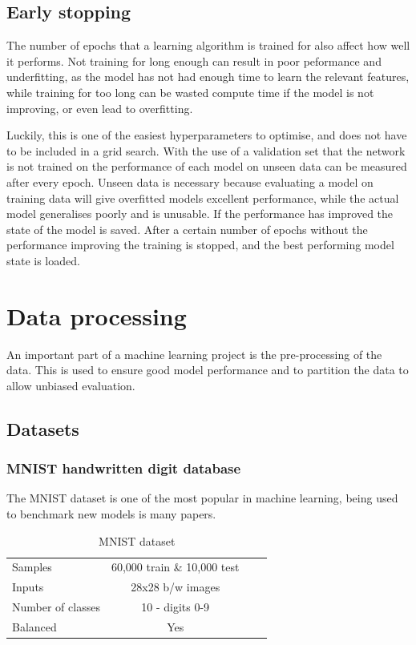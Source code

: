 \subsection{Early stopping}
The number of epochs that a learning algorithm is trained for also affect how well it performs. Not training for long enough can result in
poor peformance and underfitting, as the model has not had enough time to learn the relevant features, while training for too long can
be wasted compute time if the model is not improving, or even lead to overfitting.

Luckily, this is one of the easiest hyperparameters to optimise, and does not have to be included in a grid search. 
With the use of a validation set that the network is not trained on the performance of each model on unseen data can be measured after 
every epoch. Unseen data is necessary because evaluating a model on training data will give overfitted models excellent performance, 
while the actual model generalises poorly and is unusable.
If the performance has improved the state of the model is saved. After a certain number of epochs without the performance improving 
the training is stopped, and the best performing model state is loaded.

\section{Data processing}
An important part of a machine learning project is the pre-processing of the data. This is used to ensure good model performance and 
to partition the data to allow unbiased evaluation.

\subsection{Datasets}
\subsubsection{MNIST handwritten digit database}
The MNIST dataset is one of the most popular in machine learning, being used to benchmark new models is many papers.
\begin{table}[H]
  \label{tab:mnist}
  \small %
  \centering %
  \begin{tabular}{lccr} %
  \toprule[\heavyrulewidth]
  Samples & 60,000 train \& 10,000 test \\
  Inputs & 28x28 b/w images  \\
  Number of classes & 10 - digits 0-9 \\
  Balanced & Yes \\
  \bottomrule[\heavyrulewidth] 
  \end{tabular}
  \caption{MNIST dataset} 
\end{table}

